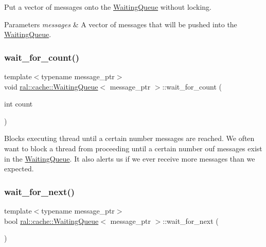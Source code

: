 Put a vector of messages onto the \hyperlink{classral_1_1cache_1_1WaitingQueue}{Waiting\+Queue} without locking. 
\begin{DoxyParams}{Parameters}
{\em messages} & A vector of messages that will be pushed into the \hyperlink{classral_1_1cache_1_1WaitingQueue}{Waiting\+Queue}. \\
\hline
\end{DoxyParams}
\mbox{\label{classral_1_1cache_1_1WaitingQueue_abd7d9824f1b89ead2c937e1c6d64ba4f}} 
\subsubsection{\texorpdfstring{wait\+\_\+for\+\_\+count()}{wait\_for\_count()}}
{\footnotesize\ttfamily template$<$typename message\+\_\+ptr$>$ \\
void \hyperlink{classral_1_1cache_1_1WaitingQueue}{ral\+::cache\+::\+Waiting\+Queue}$<$ message\+\_\+ptr $>$\+::wait\+\_\+for\+\_\+count (\begin{DoxyParamCaption}\item[{int}]{count }\end{DoxyParamCaption})\hspace{0.3cm}{\ttfamily [inline]}}

Blocks executing thread until a certain number messages are reached. We often want to block a thread from proceeding until a certain number ouf messages exist in the \hyperlink{classral_1_1cache_1_1WaitingQueue}{Waiting\+Queue}. It also alerts us if we ever receive more messages than we expected. \mbox{\label{classral_1_1cache_1_1WaitingQueue_a2849a6f841c2958aba489237a24ec0df}} 
\subsubsection{\texorpdfstring{wait\+\_\+for\+\_\+next()}{wait\_for\_next()}}
{\footnotesize\ttfamily template$<$typename message\+\_\+ptr$>$ \\
bool \hyperlink{classral_1_1cache_1_1WaitingQueue}{ral\+::cache\+::\+Waiting\+Queue}$<$ message\+\_\+ptr $>$\+::wait\+\_\+for\+\_\+next (\begin{DoxyParamCaption}{ }\end{DoxyParamCaption})\hspace{0.3cm}{\ttfamily [inline]}}

